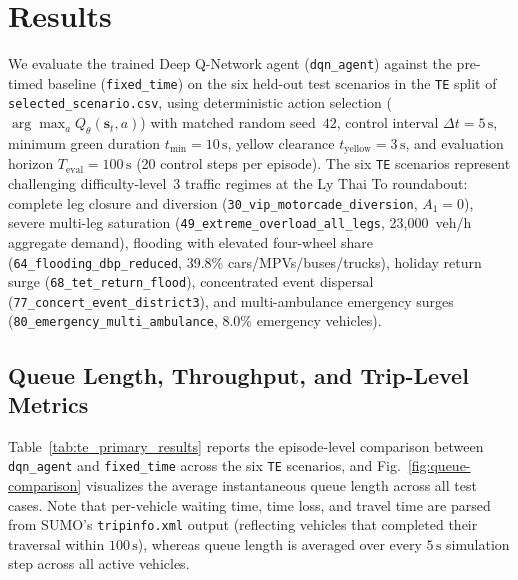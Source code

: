 \section{Results}\label{s:6}

We evaluate the trained Deep Q-Network agent (\texttt{dqn\_agent}) against the pre-timed baseline (\texttt{fixed\_time}) on the six held-out test scenarios in the \texttt{TE} split of \texttt{selected\_scenario.csv}, using deterministic action selection ($\arg\max_a Q_\theta(\mathbf{s}_t, a)$) with matched random seed~$42$, control interval $\Delta t = 5\,\mathrm{s}$, minimum green duration $t_{\min} = 10\,\mathrm{s}$, yellow clearance $t_{\text{yellow}} = 3\,\mathrm{s}$, and evaluation horizon $T_{\text{eval}} = 100\,\mathrm{s}$ (20 control steps per episode). The six \texttt{TE} scenarios represent challenging difficulty-level~3 traffic regimes at the Ly Thai To roundabout: complete leg closure and diversion (\texttt{30\_vip\_motorcade\_diversion}, $A_1 = 0$), severe multi-leg saturation (\texttt{49\_extreme\_overload\_all\_legs}, 23{,}000~veh/h aggregate demand), flooding with elevated four-wheel share (\texttt{64\_flooding\_dbp\_reduced}, 39.8\% cars/MPVs/buses/trucks), holiday return surge (\texttt{68\_tet\_return\_flood}), concentrated event dispersal (\texttt{77\_concert\_event\_district3}), and multi-ambulance emergency surges (\texttt{80\_emergency\_multi\_ambulance}, 8.0\% emergency vehicles).

\subsection{Queue Length, Throughput, and Trip-Level Metrics}

Table~\ref{tab:te_primary_results} reports the episode-level comparison between \texttt{dqn\_agent} and \texttt{fixed\_time} across the six \texttt{TE} scenarios, and Fig.~\ref{fig:queue-comparison} visualizes the average instantaneous queue length across all test cases. Note that per-vehicle waiting time, time loss, and travel time are parsed from SUMO's \texttt{tripinfo.xml} output (reflecting vehicles that completed their traversal within $100\,\mathrm{s}$), whereas queue length is averaged over every $5\,\mathrm{s}$ simulation step across all active vehicles.

